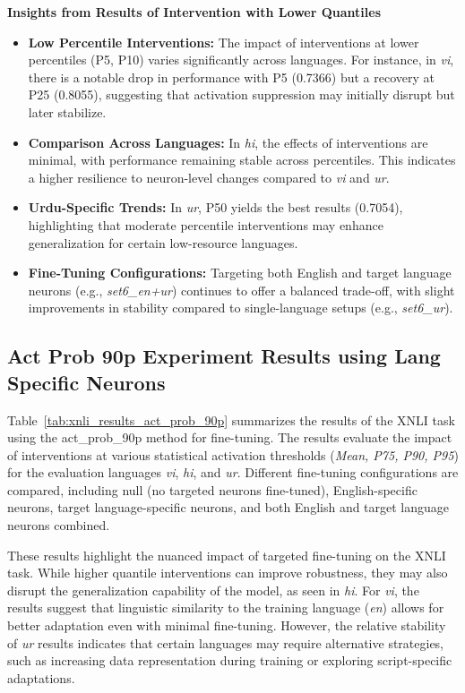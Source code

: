 \textbf{Insights from Results of Intervention with Lower Quantiles}
\begin{itemize}
	\item \textbf{Low Percentile Interventions:} The impact of interventions at lower percentiles (P5, P10) varies significantly across languages. For instance, in \textit{vi}, there is a notable drop in performance with P5 (0.7366) but a recovery at P25 (0.8055), suggesting that activation suppression may initially disrupt but later stabilize.
	\item \textbf{Comparison Across Languages:} In \textit{hi}, the effects of interventions are minimal, with performance remaining stable across percentiles. This indicates a higher resilience to neuron-level changes compared to \textit{vi} and \textit{ur}.
	\item \textbf{Urdu-Specific Trends:} In \textit{ur}, P50 yields the best results (0.7054), highlighting that moderate percentile interventions may enhance generalization for certain low-resource languages.
	\item \textbf{Fine-Tuning Configurations:} Targeting both English and target language neurons (e.g., \textit{set6\_en+ur}) continues to offer a balanced trade-off, with slight improvements in stability compared to single-language setups (e.g., \textit{set6\_ur}).
\end{itemize}

\subsection{Act Prob 90p Experiment Results using Lang Specific Neurons}

Table~\ref{tab:xnli_results_act_prob_90p} summarizes the results of the XNLI task using the act\_prob\_90p method for fine-tuning. The results evaluate the impact of interventions at various statistical activation thresholds (\textit{Mean, P75, P90, P95}) for the evaluation languages \textit{vi}, \textit{hi}, and \textit{ur}. Different fine-tuning configurations are compared, including null (no targeted neurons fine-tuned), English-specific neurons, target language-specific neurons, and both English and target language neurons combined.

These results highlight the nuanced impact of targeted fine-tuning on the XNLI task. While higher quantile interventions can improve robustness, they may also disrupt the generalization capability of the model, as seen in \textit{hi}. For \textit{vi}, the results suggest that linguistic similarity to the training language (\textit{en}) allows for better adaptation even with minimal fine-tuning. However, the relative stability of \textit{ur} results indicates that certain languages may require alternative strategies, such as increasing data representation during training or exploring script-specific adaptations.

